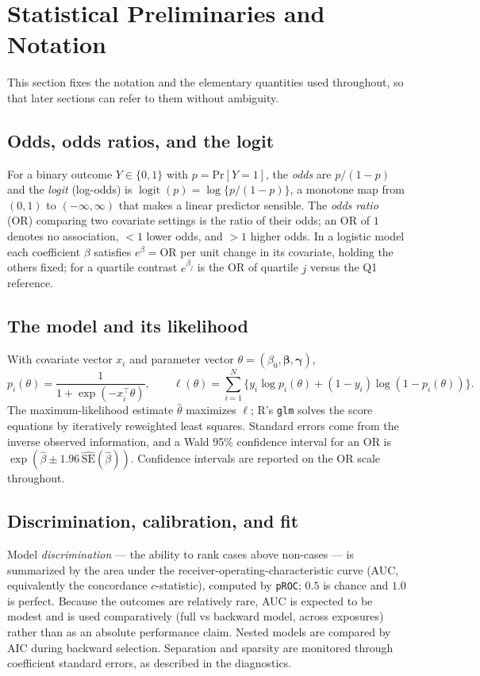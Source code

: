 \documentclass[11pt]{article}
\DeclareMathOperator{\logit}{logit}
\providecommand{\Pr}{\mathrm{Pr}}
\newcommand{\code}[1]{\texttt{\small #1}}
\begin{document}
\section{Statistical Preliminaries and Notation}
This section fixes the notation and the elementary quantities used throughout, so that later sections
can refer to them without ambiguity.

\subsection{Odds, odds ratios, and the logit}
For a binary outcome $Y \in \{0,1\}$ with $p = \Pr[Y=1]$, the \emph{odds} are $p/(1-p)$ and the
\emph{logit} (log-odds) is $\logit(p) = \log\{p/(1-p)\}$, a monotone map from $(0,1)$ to
$(-\infty,\infty)$ that makes a linear predictor sensible. The \emph{odds ratio} (OR) comparing two
covariate settings is the ratio of their odds; an OR of $1$ denotes no association, $<1$ lower odds,
and $>1$ higher odds. In a logistic model each coefficient $\beta$ satisfies $e^{\beta} = \text{OR}$ per
unit change in its covariate, holding the others fixed; for a quartile contrast $e^{\beta_j}$ is the OR
of quartile $j$ versus the Q1 reference.

\subsection{The model and its likelihood}
With covariate vector $x_i$ and parameter vector $\theta = (\beta_0, \boldsymbol\beta, \boldsymbol\gamma)$,
\[
p_i(\theta) = \frac{1}{1 + \exp(-x_i^\top \theta)}, \qquad
\ell(\theta) = \sum_{i=1}^{N}\big\{ y_i \log p_i(\theta) + (1-y_i)\log(1-p_i(\theta)) \big\}.
\]
The maximum-likelihood estimate $\hat\theta$ maximizes $\ell$; R's \code{glm} solves the score equations
by iteratively reweighted least squares. Standard errors come from the inverse observed information,
and a Wald 95\% confidence interval for an OR is $\exp(\hat\beta \pm 1.96\,\widehat{\mathrm{SE}}(\hat\beta))$.
Confidence intervals are reported on the OR scale throughout.

\subsection{Discrimination, calibration, and fit}
Model \emph{discrimination} --- the ability to rank cases above non-cases --- is summarized by the area
under the receiver-operating-characteristic curve (AUC, equivalently the concordance $c$-statistic),
computed by \code{pROC}; $0.5$ is chance and $1.0$ is perfect. Because the outcomes are relatively rare,
AUC is expected to be modest and is used comparatively (full vs backward model, across exposures) rather
than as an absolute performance claim. Nested models are compared by AIC during backward selection.
Separation and sparsity are monitored through coefficient standard errors, as described in the
diagnostics.
\end{document}
